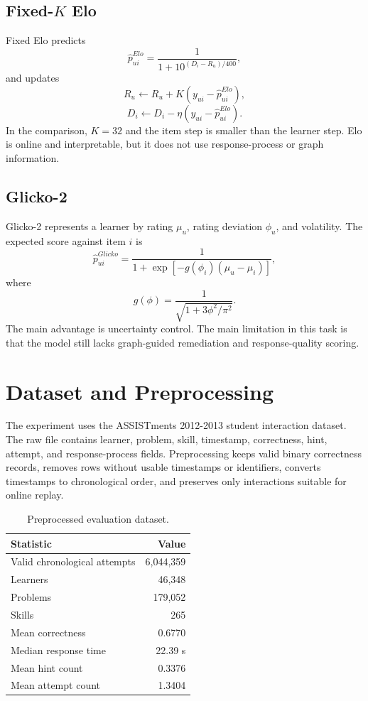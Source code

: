 \documentclass[conference]{IEEEtran}
\begin{document}
\subsection{Fixed-$K$ Elo}
Fixed Elo predicts
\begin{equation}
\hat{p}^{Elo}_{ui}=\frac{1}{1+10^{(D_i-R_u)/400}},
\end{equation}
and updates
\begin{equation}
R_u\leftarrow R_u+K(y_{ui}-\hat{p}^{Elo}_{ui}),
\end{equation}
\begin{equation}
D_i\leftarrow D_i-\eta(y_{ui}-\hat{p}^{Elo}_{ui}).
\end{equation}
In the comparison, $K=32$ and the item step is smaller than the learner step. Elo is online and interpretable, but it does not use response-process or graph information.

\subsection{Glicko-2}
Glicko-2 represents a learner by rating $\mu_u$, rating deviation $\phi_u$, and volatility. The expected score against item $i$ is
\begin{equation}
\hat{p}^{Glicko}_{ui}
=\frac{1}{1+\exp[-g(\phi_i)(\mu_u-\mu_i)]},
\end{equation}
where
\begin{equation}
g(\phi)=\frac{1}{\sqrt{1+3\phi^2/\pi^2}}.
\end{equation}
The main advantage is uncertainty control. The main limitation in this task is that the model still lacks graph-guided remediation and response-quality scoring.

\section{Dataset and Preprocessing}
The experiment uses the ASSISTments 2012-2013 student interaction dataset. The raw file contains learner, problem, skill, timestamp, correctness, hint, attempt, and response-process fields. Preprocessing keeps valid binary correctness records, removes rows without usable timestamps or identifiers, converts timestamps to chronological order, and preserves only interactions suitable for online replay.

\begin{table}[t]
\caption{Preprocessed evaluation dataset.}
\label{tab:dataset}
\centering
\begin{tabular}{lr}
\toprule
\textbf{Statistic} & \textbf{Value} \\
\midrule
Valid chronological attempts & 6,044,359 \\
Learners & 46,348 \\
Problems & 179,052 \\
Skills & 265 \\
Mean correctness & 0.6770 \\
Median response time & 22.39 s \\
Mean hint count & 0.3376 \\
Mean attempt count & 1.3404 \\
\bottomrule
\end{tabular}
\end{table}
\end{document}
